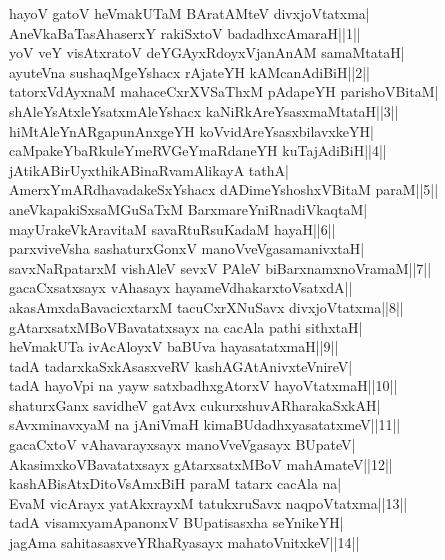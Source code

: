 \documentclass{article}
\begin{document}
hayoV gatoV heVmakUTaM BAratAMteV divxjoVtatxma|\\
AneVkaBaTasAhaserxY rakiSxtoV badadhxcAmaraH||1||\\
yoV veY visAtxratoV deYGAyxRdoyxVjanAnAM samaMtataH|\\
ayuteVna sushaqMgeYshacx rAjateYH kAMcanAdiBiH||2||\\
tatorxVdAyxnaM mahaceCxrXVSaThxM pAdapeYH parishoVBitaM|\\
shAleYsAtxleYsatxmAleYshacx kaNiRkAreYsasxmaMtataH||3||\\
hiMtAleYnARgapunAnxgeYH koVvidAreYsasxbilavxkeYH|\\
caMpakeYbaRkuleYmeRVGeYmaRdaneYH kuTajAdiBiH||4||\\
jAtikABirUyxthikABinaRvamAlikayA tathA|\\
AmerxYmARdhavadakeSxYshacx dADimeYshoshxVBitaM paraM||5||\\
aneVkapakiSxsaMGuSaTxM BarxmareYniRnadiVkaqtaM|\\
mayUrakeVkAravitaM savaRtuRsuKadaM hayaH||6||\\
parxviveVsha sashaturxGonxV manoVveVgasamanivxtaH|\\
savxNaRpatarxM vishAleV sevxV PAleV biBarxnamxnoVramaM||7||\\
gacaCxsatxsayx vAhasayx hayameVdhakarxtoVsatxdA||\\
akasAmxdaBavacicxtarxM tacuCxrXNuSavx divxjoVtatxma||8||\\
gAtarxsatxMBoVBavatatxsayx na cacAla pathi sithxtaH|\\
heVmakUTa ivAcAloyxV baBUva hayasatatxmaH||9||\\
tadA tadarxkaSxkAsasxveRV kashAGAtAnivxteVnireV|\\
tadA hayoVpi na yayw satxbadhxgAtorxV hayoVtatxmaH||10||\\
shaturxGanx savidheV gatAvx cukurxshuvARharakaSxkAH|\\
sAvxminavxyaM na jAniVmaH kimaBUdadhxyasatatxmeV||11||\\
gacaCxtoV vAhavarayxsayx manoVveVgasayx BUpateV|\\
AkasimxkoVBavatatxsayx gAtarxsatxMBoV mahAmateV||12||\\
kashABisAtxDitoVsAmxBiH paraM tatarx cacAla na|\\
EvaM vicArayx yatAkxrayxM tatukxruSavx naqpoVtatxma||13||\\
tadA visamxyamApanonxV BUpatisasxha seYnikeYH|\\
jagAma sahitasasxveYRhaRyasayx mahatoVnitxkeV||14||\\
\end{document}
